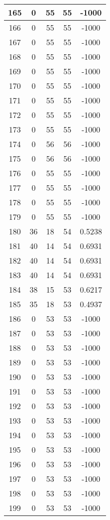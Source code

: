 \documentclass[letterpaper, 12pt]{article}
\begin{document}
\begin{longtable}{|c|c|c|c|c|}
\hline
165 & 0 & 55 & 55 & -1000 \\
\hline
166 & 0 & 55 & 55 & -1000 \\
\hline
167 & 0 & 55 & 55 & -1000 \\
\hline
168 & 0 & 55 & 55 & -1000 \\
\hline
169 & 0 & 55 & 55 & -1000 \\
\hline
170 & 0 & 55 & 55 & -1000 \\
\hline
171 & 0 & 55 & 55 & -1000 \\
\hline
172 & 0 & 55 & 55 & -1000 \\
\hline
173 & 0 & 55 & 55 & -1000 \\
\hline
174 & 0 & 56 & 56 & -1000 \\
\hline
175 & 0 & 56 & 56 & -1000 \\
\hline
176 & 0 & 55 & 55 & -1000 \\
\hline
177 & 0 & 55 & 55 & -1000 \\
\hline
178 & 0 & 55 & 55 & -1000 \\
\hline
179 & 0 & 55 & 55 & -1000 \\
\hline
180 & 36 & 18 & 54 & 0.5238 \\
\hline
181 & 40 & 14 & 54 & 0.6931 \\
\hline
182 & 40 & 14 & 54 & 0.6931 \\
\hline
183 & 40 & 14 & 54 & 0.6931 \\
\hline
184 & 38 & 15 & 53 & 0.6217 \\
\hline
185 & 35 & 18 & 53 & 0.4937 \\
\hline
186 & 0 & 53 & 53 & -1000 \\
\hline
187 & 0 & 53 & 53 & -1000 \\
\hline
188 & 0 & 53 & 53 & -1000 \\
\hline
189 & 0 & 53 & 53 & -1000 \\
\hline
190 & 0 & 53 & 53 & -1000 \\
\hline
191 & 0 & 53 & 53 & -1000 \\
\hline
192 & 0 & 53 & 53 & -1000 \\
\hline
193 & 0 & 53 & 53 & -1000 \\
\hline
194 & 0 & 53 & 53 & -1000 \\
\hline
195 & 0 & 53 & 53 & -1000 \\
\hline
196 & 0 & 53 & 53 & -1000 \\
\hline
197 & 0 & 53 & 53 & -1000 \\
\hline
198 & 0 & 53 & 53 & -1000 \\
\hline
199 & 0 & 53 & 53 & -1000 \\
\hline
\end{longtable}
\end{document}
